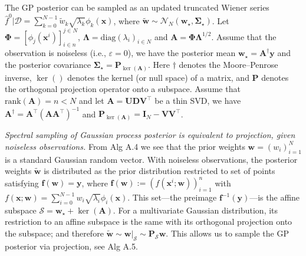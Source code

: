\documentclass{article}
\begin{document}
The GP posterior can be sampled as an updated truncated Wiener series
$\widehat{f}^0 | \mathcal{D} = \sum_{k=0}^{N-1} \widetilde{w}_k \sqrt{\lambda_k} \phi_k(\mathbf{x})$,
where
$\widetilde{\mathbf{w}} \sim \mathcal{N}_N(\mathbf{w}_\star, \boldsymbol{\Sigma}_\star)$.
Let $\boldsymbol{\Phi} = [\phi_j(\mathbf{x}^i)]_{i \in n}^{j \in N}$,
$\boldsymbol{\Lambda} = \mathrm{diag}(\lambda_i)_{i \in N}$ and
$\mathbf{A} = \boldsymbol{\Phi} \boldsymbol{\Lambda}^{1/2}$. Assume
that the observation is noiseless (i.e., $\varepsilon = 0$), we have
the posterior mean $\mathbf{w}_\star = \mathbf{A}^\dagger \mathbf{y}$
and the posterior covariance
$\boldsymbol{\Sigma}_\star = \mathbf{P}_{\ker(\mathbf{A})}$. Here
$\dagger$ denotes the Moore--Penrose inverse, $\ker()$ denotes the
kernel (or null space) of a matrix, and $\mathbf{P}$ denotes the
orthogonal projection operator onto a subspace. Assume that
$\mathrm{rank}(\mathbf{A}) = n < N$ and let
$\mathbf{A} = \mathbf{U} \mathbf{D} \mathbf{V}^\intercal$ be a thin
SVD, we have
$\mathbf{A}^\dagger = \mathbf{A}^\intercal (\mathbf{A} \mathbf{A}^\intercal)^{-1}$
and
$\mathbf{P}_{\ker(\mathbf{A})} = \mathbf{I}_N - \mathbf{V} \mathbf{V}^\intercal$.

\emph{Spectral sampling of Gaussian process posterior is equivalent to
projection, given noiseless observations.} From Alg A.4 we see that the
prior weights $\mathbf{w} = (w_i)_{i=1}^N$ is a standard Gaussian
random vector. With noiseless observations, the posterior weights
$\widetilde{\mathbf{w}}$ is distributed as the prior distribution
restricted to set of points satisfying
$\mathbf{f}(\mathbf{w}) = \mathbf{y}$, where
$\mathbf{f}(\mathbf{w}) := (f(\mathbf{x}^i; \mathbf{w}))_{i=1}^n$ with
$f(\mathbf{x}; \mathbf{w}) = \sum_{i=0}^{N-1} w_i \sqrt{\lambda_i} \phi_i(\mathbf{x})$.
This set---the preimage $\mathbf{f}^{-1}(\mathbf{y})$---is the affine
subspace $\mathcal{S} = \mathbf{w}_\star + \ker(\mathbf{A})$. For a
multivariate Gaussian distribution, its restriction to an affine
subspace is the same with its orthogonal projection onto the subspace;
and therefore
$\widetilde{\mathbf{w}} \sim \mathbf{w}|_{\mathcal{S}} \sim \mathbf{P}_{\mathcal{S}} \mathbf{w}$.
This allows us to sample the GP posterior via projection, see Alg A.5.
\end{document}
